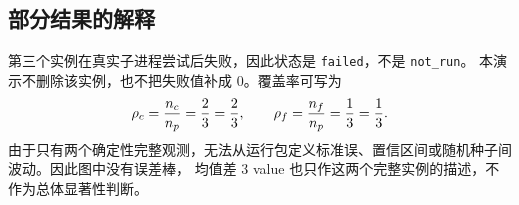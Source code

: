 \subsection{部分结果的解释}

第三个实例在真实子进程尝试后失败，因此状态是 \texttt{failed}，不是 \texttt{not\_run}。
本演示不删除该实例，也不把失败值补成 $0$。覆盖率可写为
\begin{equation}
  \rho_c=\frac{n_c}{n_p}=\frac{2}{3}=\frac{2}{3},
  \qquad
  \rho_f=\frac{n_f}{n_p}=\frac{1}{3}=\frac{1}{3}.
\end{equation}
由于只有两个确定性完整观测，无法从运行包定义标准误、置信区间或随机种子间波动。因此图中没有误差棒，
均值差 $3$ value 也只作这两个完整实例的描述，不作为总体显著性判断。
